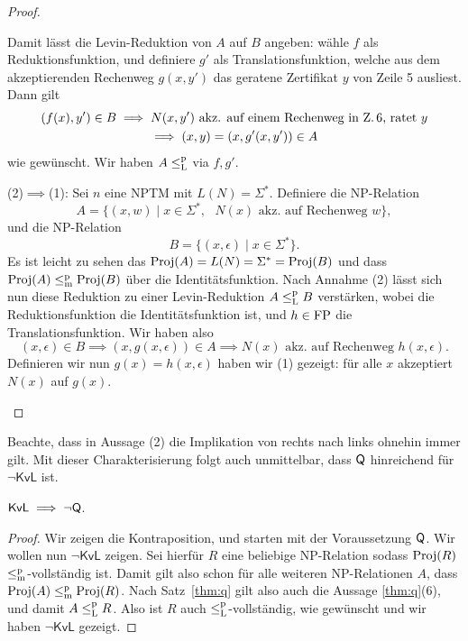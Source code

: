 \begin{proof}
\begin{prooflist}[label={}]
    Damit lässt die Levin-Reduktion von $A$ auf $B$ angeben: wähle $f$ als Reduktionsfunktion, und definiere $g'$ als Translationsfunktion, welche aus dem akzeptierenden Rechenweg $g(x, y')$ das geratene Zertifikat $y$ von Zeile 5 ausliest. Dann gilt
    \begin{gather*}
        (f(x), y') \in B \implies N(x, y') \text{ akz. auf einem Rechenweg in Z.\,6, ratet $y$}\\
        \implies (x,y)=(x, g'(x, y'))\in A
    \end{gather*}
    wie gewünscht. Wir haben $A\leq_\mathrm{L}^\mathrm{p}$ via $f, g'$.
\item (2)$\implies$(1): Sei $n$ eine NPTM mit $L(N)=\Sigma^*$.
    Definiere die NP-Relation
    \[ A = \{ (x, w) \mid x\in\Sigma^*,\text{ $N(x)$ akz. auf Rechenweg $w$} \}, \]
    und die NP-Relation
    \[ B = \{ (x, \epsilon) \mid x\in\Sigma^* \}. \]
    Es ist leicht zu sehen das $\operatorname{Proj}(A)=L(N)=\Sigma^*=\operatorname{Proj}(B)$ und dass $\operatorname{Proj}(A)\leq_\mathrm{m}^\mathrm{p}\operatorname{Proj}(B)$ über die Identitätsfunktion.
    Nach Annahme (2) lässt sich nun diese Reduktion zu einer Levin-Reduktion $A\leq_\mathrm{L}^\mathrm{p} B$ verstärken, wobei die Reduktionsfunktion die Identitätsfunktion ist, und $h\in\mathrm{FP}$ die Translationsfunktion.
    Wir haben also
    \[ (x,\epsilon)\in B \implies (x, g(x, \epsilon))\in A \implies \text{$N(x)$ akz. auf Rechenweg $h(x,\epsilon)$}. \]
    Definieren wir nun $g(x)=h(x,\epsilon)$ haben wir (1) gezeigt: für alle $x$ akzeptiert $N(x)$ auf $g(x)$.
\end{prooflist}
\end{proof}

Beachte, dass in Aussage (2) die Implikation von rechts nach links ohnehin immer gilt. Mit dieser Charakterisierung folgt auch unmittelbar, dass $\mathsf{Q}$ hinreichend für $\neg\mathsf{KvL}$ ist.


\begin{theorem}\label{thm:kvl-implies-q}
    $\mathsf{KvL} \implies \neg\mathsf{Q}$.
\end{theorem}
\begin{proof}
    Wir zeigen die Kontraposition, und starten mit der Voraussetzung $\mathsf{Q}$.
    Wir wollen nun $\neg\mathsf{KvL}$ zeigen. Sei hierfür $R$ eine beliebige NP-Relation sodass $\operatorname{Proj}(R)$ $\leq_\mathrm{m}^\mathrm{p}$-vollständig ist.
    Damit gilt also schon für alle weiteren NP-Relationen $A$, dass $\operatorname{Proj}(A)\leq_\mathrm{m}^\mathrm{p}\operatorname{Proj}(R)$.
    Nach Satz~\ref{thm:q} gilt also auch die Aussage \ref{thm:q}(6), und damit $A\leq_\mathrm{L}^\mathrm{p} R$. Also ist $R$ auch $\leq_\mathrm{L}^\mathrm{p}$-vollständig, wie gewünscht und wir haben $\neg\mathsf{KvL}$ gezeigt.
\end{proof}

